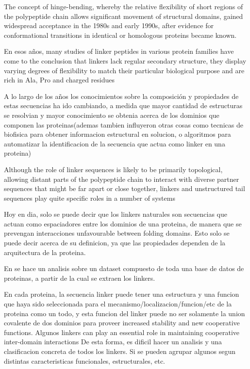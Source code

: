 The concept of hinge-bending, whereby the relative flexibility of short regions of the polypeptide chain allows significant movement of structural domains, gained widespread acceptance in
the 1980s and early 1990s, after evidence for conformational transitions in identical or homologous proteins became known.


En esos años, many studies of linker peptides in various protein families have come to the conclusion that linkers lack regular secondary structure, they display varying degrees of flexibility to match their particular biological purpose and are rich in Ala, Pro and charged residues

A lo largo de los años los conocimientos sobre la composición y propiedades de estas secuencias ha ido cambiando, 
a medida que mayor cantidad de estructuras se resolvian y mayor conocimiento se obtenia acerca de los dominios que componen las proteinas(ademas tambien influyeron otras cosas como tecnicas de biofisica para obtener informacion estructural en solucion, o algoritmos para automatizar la identificacion de la secuencia que actua como linker en una proteina)

Although the role of linker sequences is likely to be primarily topological, allowing distant parts of the polypeptide chain to interact with diverse partner sequences that might be far apart or close together, linkers and unstructured tail sequences play quite specific roles in a
number of systems

Hoy en dia, solo se puede decir que los linkers naturales son secuencias que actuan como espaciadores entre los dominios de una proteina, de manera que se prevengan interacciones unfavourable between folding domains. 
Esto solo se puede decir acerca de su definicion, ya que las propiedades dependen de la arquitectura de la proteina.

En \cite{george2002analysis} se hace un analisis sobre un dataset compuesto de toda una base de datos de proteinas, a partir de la cual se extraen los linkers.


En cada proteina, la secuencia linker puede tener una estructura y una funcion que haya sido seleccionada para el mecanismo/localizacion/funcion/etc de la proteina como un todo, y esta funcion del linker puede no ser solamente la union covalente de dos dominios para proveer increased stability and new cooperative functions.
Algunos linkers can play an essential role in maintaining cooperative inter-domain interactions
De esta forma, es dificil hacer un analisis y una clasificacion concreta de todos los linkers. Si se pueden agrupar algunos segun distintas caracteristicas funcionales, estructurales, etc.




